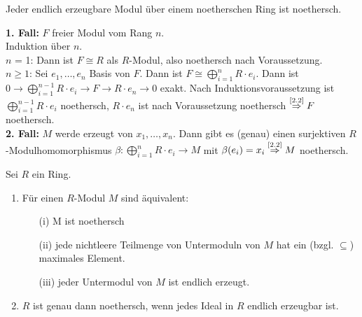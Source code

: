 \begin{Folg}
\label{2.3}
  Jeder endlich erzeugbare Modul über einem noetherschen Ring ist noethersch.
\end{Folg}

\begin{Bew}
  \textbf{1. Fall:} $F$ freier Modul vom Rang $n$.\\
  Induktion über $n$.\\
  $n$ = 1: Dann ist $F \cong R$ als $R$-Modul, also noethersch nach
  Voraussetzung.\\
  $n \ge 1$: Sei $e_1, \dots , e_n$ Basis von $F$. Dann ist $F \cong
  \bigoplus_{i = 1}^n R \cdot e_i$. Dann ist $0 \to \bigoplus_{i = 1}^{n-1} R \cdot
  e_i \to F \to R \cdot e_n \to 0$ exakt. Nach Induktionsvoraussetzung ist
  $\bigoplus_{i = 1}^{n-1} R \cdot e_i$ noethersch, $R \cdot e_n$ ist nach
  Voraussetzung noethersch $\overset{\mbox{\scriptsize \ref{2.2}}}{\Rightarrow}
  F$ noethersch.\\
  \textbf{2. Fall:} $M$ werde erzeugt von $x_1, \dots , x_n$. Dann gibt es
  (genau) einen surjektiven $R$-Modulhomomorphismus $\beta: \bigoplus_{i = 1}^n
  R \cdot e_i \to M$ mit $\beta(e_i) = x_i \overset{\mbox{\scriptsize
  \ref{2.2}}}{\Rightarrow} M$ noethersch.
\end{Bew}

\begin{Prop}
  Sei $R$ ein Ring.
  \begin{enumerate}
    \item \label{2.4a}Für einen $R$-Modul $M$ sind äquivalent:
      \begin{enumerate}
        \item[(i)] M ist noethersch
        \item[(ii)] jede nichtleere Teilmenge von Untermoduln von $M$ hat ein
                    (bzgl. $\subseteq$) maximales Element.
        \item[(iii)] jeder Untermodul von $M$ ist endlich erzeugt.
      \end{enumerate}
    \item $R$ ist genau dann noethersch, wenn jedes Ideal in $R$ endlich
          erzeugbar ist.
  \end{enumerate}
\end{Prop}

